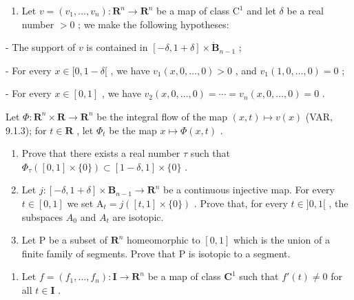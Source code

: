 \begin{enumerate}
\def\labelenumi{\arabic{enumi})}
\setcounter{enumi}{29}
\tightlist
\item
  Let \(v = (v_{1},\ldots ,v_{n})\colon \mathbf{R}^{n}\to \mathbf{R}^{n}\) be a map of class \(\mathrm{C}^1\) and let \(\delta\) be a real number \(>0\) ; we make the following hypotheses:
\end{enumerate}

- The support of \(v\) is contained in \([- \delta, 1 + \delta] \times \mathring{\mathbf{B}}_{n-1}\) ;

- For every \(x \in [0, 1 - \delta[\) , we have \(v_1(x, 0, \ldots, 0) > 0\) , and \(v_1(1, 0, \ldots, 0) = 0\) ;

- For every \(x \in [0,1]\) , we have \(v_{2}(x,0,\ldots,0) = \cdots = v_{n}(x,0,\ldots,0) = 0\) .

Let \(\Phi\colon\mathbf{R}^{n}\times\mathbf{R}\to\mathbf{R}^{n}\) be the integral flow of the map \((x,t)\mapsto v(x)\) (VAR, 9.1.3); for \(t\in\mathbf{R}\) , let \(\Phi_{t}\) be the map \(x\mapsto\Phi(x,t)\) .

\begin{enumerate}
\def\labelenumi{\alph{enumi})}
\item
  Prove that there exists a real number \(\tau\) such that \(\Phi_{\tau}([0,1] \times \{0\}) \subset [1 - \delta, 1] \times \{0\}\) .
\item
  Let \(j\colon[-\delta,1+\delta]\times\mathbf{B}_{n-1}\to\mathbf{R}^{n}\) be a continuous injective map. For every \(t\in[0,1]\) we set \(\mathrm{A}_{t}=j([t,1]\times\{0\})\) . Prove that, for every \(t\in]0,1[\) , the subspaces \(A_{0}\) and \(A_{t}\) are isotopic.
\item
  Let P be a subset of \(\mathbf{R}^{n}\) homeomorphic to \([0,1]\) which is the union of a finite family of segments. Prove that P is isotopic to a segment.
\end{enumerate}

\begin{enumerate}
\def\labelenumi{\arabic{enumi})}
\setcounter{enumi}{30}
\tightlist
\item
  Let \(f = (f_1, \ldots, f_n) \colon \mathbf{I} \to \mathbf{R}^n\) be a map of class \(\mathbf{C}^1\) such that \(f'(t) \neq 0\) for all \(t \in \mathbf{I}\) .
\end{enumerate}


